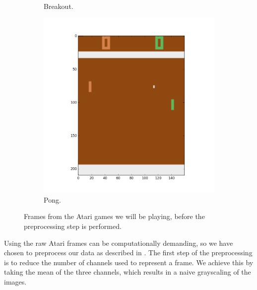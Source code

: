 \documentclass[11pt]{article}
\begin{document}
\begin{figure}[H]
\begin{subfigure}{.3\textwidth}
        \caption{Breakout.}
        \label{fig:scanlike}
    \end{subfigure}
    \begin{subfigure}{.3\textwidth}
        \centering
        \includegraphics[scale=0.25]{include/pong_1.png}
        \caption{Pong.}
        \label{fig:scan}
    \end{subfigure}
    \caption{Frames from the Atari games we will be playing, before the preprocessing step is performed.}
     \label{fig:games}
\end{figure}
Using the raw Atari frames can be computationally demanding, so we have chosen
to preprocess our data as described in \cite{dqn}. 
The first step of the preprocessing is to reduce the number of channels used to
represent a frame.
We achieve this by taking the mean of the three channels, which results
in a naive grayscaling of the images.
\end{document}
